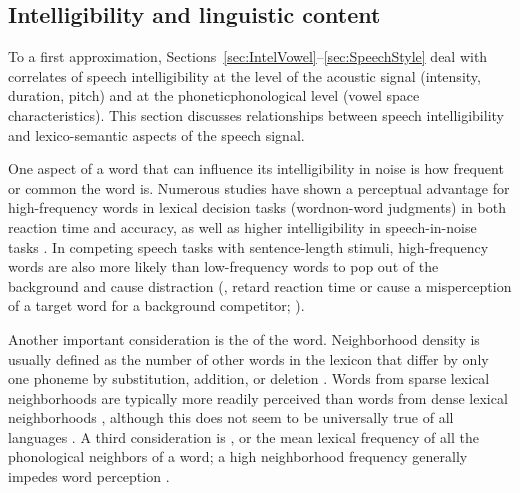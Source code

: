 
\subsection{Intelligibility and linguistic content}
To a first approximation, Sections~\ref{sec:IntelVowel}–\ref{sec:SpeechStyle} deal with correlates of speech intelligibility at the level of the acoustic signal (intensity, duration, pitch) and at the phonetic\slsh phonological level (vowel space characteristics).  This section discusses relationships between speech intelligibility and lexico-semantic aspects of the speech signal.

One aspect of a word that can influence its intelligibility in noise is how frequent or common the word is.  Numerous studies have shown a perceptual advantage for high-frequency words in lexical decision tasks (word\slsh non-word judgments) in both reaction time and accuracy, as well as higher intelligibility in speech-in-noise tasks \citep[\eg,][]{Howes1957, Savin1963, VitevitchLuce1998, DirksEtAl2001, TakayanagiEtAl2002, VitevitchRodriguez2005}.  In competing speech tasks with sentence-length stimuli, high-frequency words are also more likely than low-frequency words to pop out of the background and cause distraction (\ie, retard reaction time or cause a misperception of a target word for a background competitor; \citealt{BoulengerEtAl2010}).

Another important consideration is the  of the word.  Neighborhood density is usually defined as the number of other words in the lexicon that differ by only one phoneme by substitution, addition, or deletion \citep{LucePisoni1998}.  Words from sparse lexical neighborhoods are typically more readily perceived than words from dense lexical neighborhoods  \citep{VitevitchLuce1998, ZieglerEtAl2003}, although this does not seem to be universally true of all languages \citep{VitevitchRodriguez2005}.  A third consideration is , or the mean lexical frequency of all the phonological neighbors of a word; a high neighborhood frequency generally impedes word perception \citep{LucePisoni1998}.  

